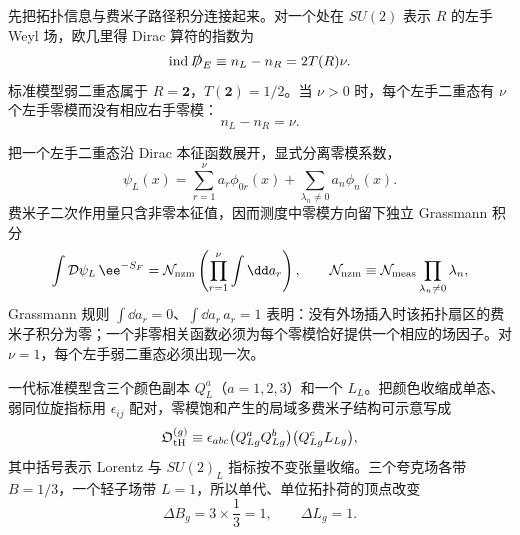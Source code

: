\begin{derivation}
先把拓扑信息与费米子路径积分连接起来。对一个处在 $SU(2)$ 表示 $R$ 的左手 Weyl 场，欧几里得 Dirac 算符的指数为
\begin{equation*}
 \operatorname{ind}\slashed D_E
 \equiv n_L-n_R=2T(R)\nu.
\end{equation*}
标准模型弱二重态属于 $R=\mathbf2$，$T(\mathbf2)=1/2$。当 $\nu>0$ 时，每个左手二重态有 $\nu$ 个左手零模而没有相应右手零模：
\begin{equation*}
 n_L-n_R=\nu.
\end{equation*}

把一个左手二重态沿 Dirac 本征函数展开，显式分离零模系数，
\begin{equation*}
 \psi_L(x)=\sum_{r=1}^{\nu}a_r\phi_{0r}(x)
 +\sum_{\lambda_n\neq0}a_n\phi_n(x).
\end{equation*}
费米子二次作用量只含非零本征值，因而测度中零模方向留下独立 Grassmann 积分
\begin{equation*}
 \int\mathcal D\psi_L\,\ee^{-S_F}
 =\mathcal N_{\rm nzm}
 \left(\prod_{r=1}^{\nu}\int\dd a_r\right),
 \qquad
 \mathcal N_{\rm nzm}\equiv
 \mathcal N_{\rm meas}\prod_{\lambda_n\neq0}\lambda_n,
\end{equation*}
Grassmann 规则 $\int\dd a_r=0$、$\int\dd a_r\,a_r=1$ 表明：没有外场插入时该拓扑扇区的费米子积分为零；一个非零相关函数必须为每个零模恰好提供一个相应的场因子。对 $\nu=1$，每个左手弱二重态必须出现一次。

一代标准模型含三个颜色副本 $Q_L^a$（$a=1,2,3$）和一个 $L_L$。把颜色收缩成单态、弱同位旋指标用 $\epsilon_{ij}$ 配对，零模饱和产生的局域多费米子结构可示意写成
\begin{equation*}
 \mathfrak O_{\rm tH}^{(g)}
 \equiv
 \epsilon_{abc}
 \bigl(Q_{Lg}^{a}Q_{Lg}^{b}\bigr)
 \bigl(Q_{Lg}^{c}L_{Lg}\bigr),
\end{equation*}
其中括号表示 Lorentz 与 $SU(2)_L$ 指标按不变张量收缩。三个夸克场各带 $B=1/3$，一个轻子场带 $L=1$，所以单代、单位拓扑荷的顶点改变
\begin{equation*}
 \Delta B_{g}=3\times\frac13=1,
 \qquad
 \Delta L_{g}=1.
\end{equation*}


\end{derivation}
